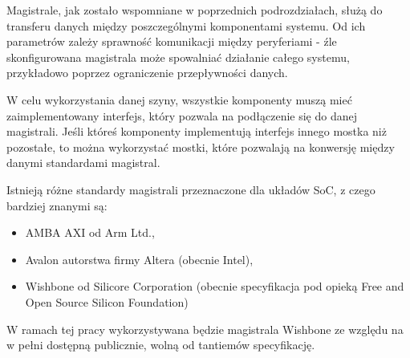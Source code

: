 Magistrale, jak zostało wspomniane w poprzednich podrozdziałach, służą do transferu danych między poszczególnymi komponentami systemu. Od ich parametrów zależy sprawność komunikacji między peryferiami - źle skonfigurowana magistrala może spowalniać działanie całego systemu, przykładowo poprzez ograniczenie przepływności danych.

W celu wykorzystania danej szyny, wszystkie komponenty muszą mieć zaimplementowany interfejs, który pozwala na podłączenie się do danej magistrali. Jeśli któreś komponenty implementują interfejs innego mostka niż pozostałe, to można wykorzystać mostki, które pozwalają na konwersję między danymi standardami magistral.


Istnieją różne standardy magistrali przeznaczone dla układów SoC, z czego bardziej znanymi są:

\begin{itemize}
	\item AMBA AXI od Arm Ltd.,
	\item Avalon autorstwa firmy Altera (obecnie Intel),
	\item Wishbone od Silicore Corporation (obecnie specyfikacja pod opieką Free and Open Source Silicon Foundation)
\end{itemize}

W ramach tej pracy wykorzystywana będzie magistrala Wishbone ze względu na w pełni dostępną publicznie, wolną od tantiemów specyfikację.

